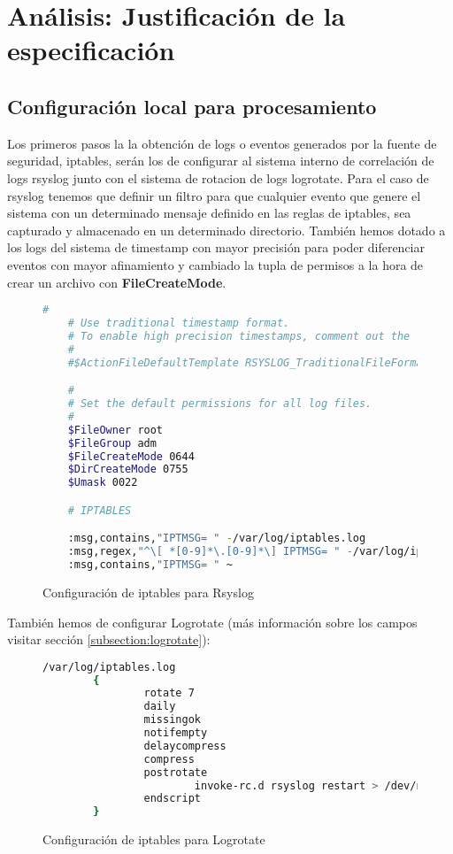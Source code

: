 \section[Análisis]{Análisis: Justificación de la especificación}

\subsection[Configuración local]{Configuración local para procesamiento}
Los primeros pasos la la obtención de logs o eventos generados por la fuente de seguridad, iptables, serán los de configurar al sistema interno de correlación de logs rsyslog junto con el sistema de rotacion de logs logrotate. Para el caso de rsyslog tenemos que definir un filtro para que cualquier evento que genere el sistema con un determinado mensaje definido en las reglas de iptables, sea capturado y almacenado en un determinado directorio. También hemos dotado a los logs del sistema de timestamp con mayor precisión para poder diferenciar eventos con mayor afinamiento y cambiado la tupla de permisos a la hora de crear un archivo con \textbf{FileCreateMode}.

\begin{figure}[H]
  \begin{lstlisting}[language=bash]
    #
    # Use traditional timestamp format.
    # To enable high precision timestamps, comment out the following line.
    #
    #$ActionFileDefaultTemplate RSYSLOG_TraditionalFileFormat

    #
    # Set the default permissions for all log files.
    #
    $FileOwner root
    $FileGroup adm
    $FileCreateMode 0644
    $DirCreateMode 0755
    $Umask 0022

    # IPTABLES

    :msg,contains,"IPTMSG= " -/var/log/iptables.log
    :msg,regex,"^\[ *[0-9]*\.[0-9]*\] IPTMSG= " -/var/log/iptables.log
    :msg,contains,"IPTMSG= " ~

  \end{lstlisting}
  \caption{Configuración de iptables para Rsyslog}
\end{figure}
\pagebreak
También hemos de configurar Logrotate (más información sobre los campos visitar sección \ref{subsection:logrotate}):

\begin{figure}[H]
\begin{lstlisting}[language=bash]
/var/log/iptables.log
        {
                rotate 7
                daily
                missingok
                notifempty
                delaycompress
                compress
                postrotate
                        invoke-rc.d rsyslog restart > /dev/null
                endscript
        }
\end{lstlisting}
\caption{Configuración de iptables para Logrotate}
\end{figure}

